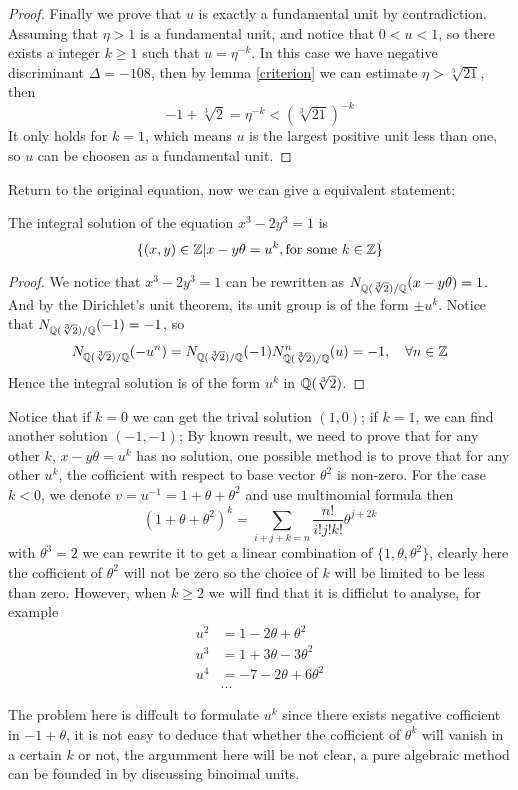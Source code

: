 \begin{proposition}
\begin{proof}
        Finally we prove that \(u\) is exactly a fundamental unit by contradiction. Assuming that \(\eta>1\) is a fundamental unit, and notice that \(0<u<1\), so there exists a integer \(k \geq 1\) such that \(u = \eta^{-k}\). In this case we have negative discriminant \(\Delta = -108\), then by lemma \ref{criterion} we can estimate \(\eta > \sqrt[3]{21}\), then 
        \[-1 + \sqrt[3]{2} = \eta^{-k} < (\sqrt[3]{21})^{-k}\]
        It only holds for \(k=1\), which means \(u\) is the largest positive unit less than one, so \(u\) can be choosen as a fundamental unit.
        
    \end{proof}
\end{proposition}

Return to the original equation, now we can give a equivalent statement:
\begin{proposition} \label{equi}
    The integral solution of the equation \(x^3-2y^3=1\) is
    \[\{(x,y)\in \mathbb{Z}| x-y\theta = u^k, \text{for some } k \in \mathbb{Z}\}\]

    \begin{proof}
        We notice that \(x^3-2y^3 = 1 \) can be rewritten as \(N_{\mathbb{Q}(\sqrt[3]{2}) / \mathbb{Q}}(x-y\theta) = 1\). And by the Dirichlet's unit theorem, its unit group is of the form \(\pm u^k\). Notice that \(N_{\mathbb{Q}(\sqrt[3]{2}) / \mathbb{Q}}(-1) = -1\), so
        \[N_{\mathbb{Q}(\sqrt[3]{2}) / \mathbb{Q}}(-u^n) = N_{\mathbb{Q}(\sqrt[3]{2}) / \mathbb{Q}}(-1)N_{\mathbb{Q}(\sqrt[3]{2}) / \mathbb{Q}}^n(u) = -1, \quad \forall n \in \mathbb{Z} \]
        Hence the integral solution is of the form \(u^k\) in \(\mathbb{Q}(\sqrt[3]{2})\).
    \end{proof}
\end{proposition}

Notice that if \(k=0\) we can get the trival solution \((1,0)\); if \(k=1\), we can find another solution \((-1,-1)\); By known result, we need to prove that for any other \(k\), \(x-y\theta = u^k\) has no solution, one possible method is to prove that for any other \(u^k\), the cofficient with respect to base vector \(\theta^2\) is non-zero. For the case \(k<0\), we denote \(v=u^{-1} = 1+\theta +\theta^2\) and use multinomial formula then
\[(1+\theta+ \theta^2)^k = \sum_{i+j+k=n} \frac{n!}{i!j!k!}\theta ^{j+2k}\]
with \(\theta ^3= 2\) we can rewrite it to get a linear combination of \(\{1,\theta,\theta ^2\}\), clearly here the cofficient of \(\theta ^2\) will not be zero so the choice of \(k\) will be limited to be less than zero. However, when \(k \geq  2\) we will find that it is difficlut to analyse, for example
\begin{align*}
    u^2 &= 1- 2\theta +\theta^2 \\
    u^3 &= 1+3\theta-3\theta^2 \\
    u^4 &= -7-2\theta+6\theta^2\\
    &...
\end{align*}
 
The problem here is diffcult to formulate \(u^{k}\) since there exists negative cofficient in \(-1+\theta\), it is not easy to deduce that whether the cofficient of \(\theta^k\) will vanish in a certain \(k\) or not, the argumment here will be not clear, a pure algebraic method can be founded in \cite[Chapter 24]{mordell1969diophantine} by discussing binoimal units.
